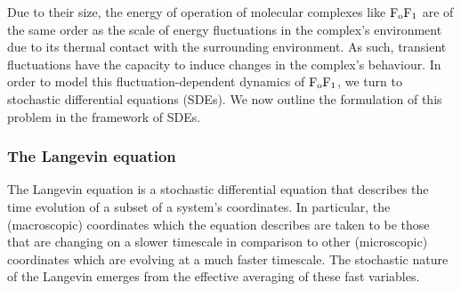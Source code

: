 \documentclass[10pt]{article}
\newcommand{\fofI}{\mathrm{F}_{\rm o}\mathrm{F}_{1}}
\begin{document}
Due to their size, the energy of operation of molecular complexes like $\fofI$ are of the same order as the scale of energy fluctuations in
the complex's environment due to its thermal contact with the surrounding environment. As such, transient fluctuations have the capacity
to induce changes in the complex's behaviour. In order to model this fluctuation-dependent dynamics of $\fofI$, we turn to stochastic differential equations (SDEs). We now outline the formulation of this problem in the framework of SDEs.

\subsubsection{The Langevin equation}

The Langevin equation is a stochastic differential equation that describes the time evolution of a subset of a system's coordinates. In particular, the (macroscopic) coordinates which the equation describes are taken to be those that are changing on a slower timescale in 
comparison to other (microscopic) coordinates which are evolving at a much faster timescale. The stochastic nature of the Langevin emerges from the effective averaging of these fast variables. 
\end{document}
